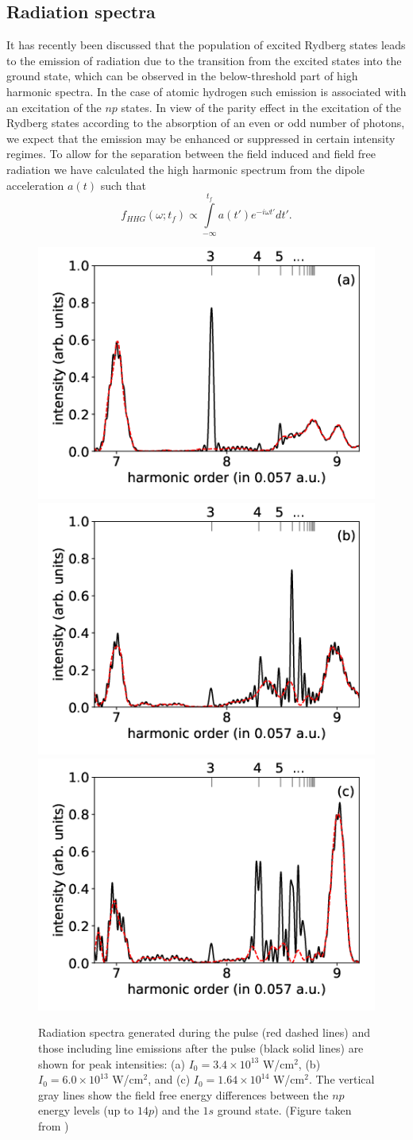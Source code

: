 \subsection{Radiation spectra}
\label{sub:radiation}

It has recently been discussed \cite{chini2014,camp2015,beaulieu2016} that the population of excited Rydberg states leads to the emission of radiation due to the transition from the excited states into the ground state, which can be observed in the below-threshold part of high harmonic spectra. In the case of atomic hydrogen such emission is associated with an excitation of the $np$ states. In view of the parity effect in the excitation of the Rydberg states according to the absorption of an even or odd number of photons, we expect that the emission may be enhanced or suppressed in certain intensity regimes. To allow for the separation between the field induced and field free radiation we have calculated the high harmonic spectrum from the dipole acceleration $a(t)$ such that
%
\begin{equation}
f_{HHG}(\omega; t_f)  \propto \int\limits_{-\infty}^{t_f}  a(t') e^{-i\omega t'} dt'.
\end{equation}

\begin{figure}[!ht]
\centering
\includegraphics[width=0.32\columnwidth]{figs/Rydberg/HHG_3p4e13.png}
\includegraphics[width=0.32\columnwidth]{figs/Rydberg/HHG_6p0e13.png}
\includegraphics[width=0.32\columnwidth]{figs/Rydberg/HHG_16p4e13.png}
\caption{Radiation spectra generated during the pulse (red dashed lines) and those including line emissions after the pulse (black solid lines) are shown for peak intensities:
(a) $I_0 = 3.4\times10^{13}$ W/cm$^2$, 
(b) $I_0 = 6.0\times10^{13}$ W/cm$^2$, and
(c) $I_0 = 1.64\times10^{14}$ W/cm$^2$.
The vertical gray lines show the field free energy differences between the $np$ energy levels (up to $14p$) and the $1s$ ground state. (Figure taken from \cite{venzke2018_ryd})
}
\label{fig:HHG_6_10}
\end{figure}

